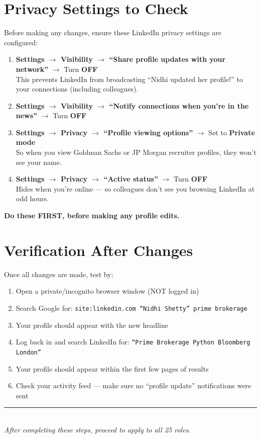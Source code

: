 \documentclass[11pt,a4paper]{article}
\begin{document}
\section{Privacy Settings to Check}

Before making any changes, ensure these LinkedIn privacy settings are configured:

\begin{enumerate}[leftmargin=1.5em]
    \item \textbf{Settings $\rightarrow$ Visibility $\rightarrow$ ``Share profile updates with your network''} $\rightarrow$ Turn \textbf{OFF}\\
    {\small This prevents LinkedIn from broadcasting ``Nidhi updated her profile!'' to your connections (including colleagues).}
    \item \textbf{Settings $\rightarrow$ Visibility $\rightarrow$ ``Notify connections when you're in the news''} $\rightarrow$ Turn \textbf{OFF}
    \item \textbf{Settings $\rightarrow$ Privacy $\rightarrow$ ``Profile viewing options''} $\rightarrow$ Set to \textbf{Private mode}\\
    {\small So when you view Goldman Sachs or JP Morgan recruiter profiles, they won't see your name.}
    \item \textbf{Settings $\rightarrow$ Privacy $\rightarrow$ ``Active status''} $\rightarrow$ Turn \textbf{OFF}\\
    {\small Hides when you're online --- so colleagues don't see you browsing LinkedIn at odd hours.}
\end{enumerate}

\textbf{Do these FIRST, before making any profile edits.}

\section{Verification After Changes}

Once all changes are made, test by:

\begin{enumerate}[leftmargin=1.5em]
    \item Open a private/incognito browser window (NOT logged in)
    \item Search Google for: \texttt{site:linkedin.com ``Nidhi Shetty'' prime brokerage}
    \item Your profile should appear with the new headline
    \item Log back in and search LinkedIn for: \texttt{``Prime Brokerage Python Bloomberg London''}
    \item Your profile should appear within the first few pages of results
    \item Check your activity feed --- make sure no ``profile update'' notifications were sent
\end{enumerate}

\vspace{12pt}
\begin{center}
\textcolor{primary}{\rule{0.5\textwidth}{0.5pt}}\\[8pt]
{\small\textit{After completing these steps, proceed to apply to all 25 roles.}}
\end{center}
\end{document}
